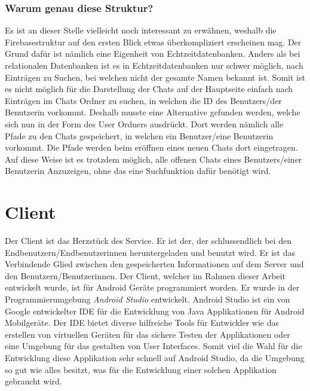 \documentclass[a4paper,11pt]{report}
\begin{document}
				\subsubsection{Warum genau diese Struktur?} \label{warum}
				Es ist an dieser Stelle vielleicht noch interessant zu erwähnen, weshalb die Firebasestruktur auf den ersten Blick etwas überkompliziert erscheinen mag. Der Grund dafür ist nämlich eine Eigenheit von Echtzeitdatenbanken. Anders als bei relationalen Datenbanken ist es in Echtzeitdatenbanken nur schwer möglich, nach Einträgen zu Suchen, bei welchen nicht der gesamte Namen bekannt ist. Somit ist es nicht möglich für die Darstellung der Chats auf der Hauptseite einfach nach Einträgen im Chats Ordner zu suchen, in welchen die ID des Benutzers/der Benutzerin vorkommt. Deshalb musste eine Alternative gefunden werden, welche sich nun in der Form des User Ordners ausdrückt. Dort werden nämlich alle Pfade zu den Chats gespeichert, in welchen ein Benutzer/eine Benutzerin vorkommt. Die Pfade werden beim eröffnen eines neuen Chats dort eingetragen. Auf diese Weise ist es trotzdem möglich, alle offenen Chats eines Benutzers/einer Benutzerin Anzuzeigen, ohne das eine Suchfunktion dafür benötigt wird.
		\section{Client}
		Der Client ist das Herzstück des Service. Er ist der, der schlussendlich bei den Endbenutzern/Endbenutzerinnen heruntergeladen und benutzt wird. Er ist das Verbindende Glied zwischen den gespeicherten Informationen auf dem Server und den Benutzern/Benutzerinnen. Der Client, welcher im Rahmen dieser Arbeit entwickelt wurde, ist für Android Geräte programmiert worden. Er wurde in der Programmierumgebung \emph{Android Studio} entwickelt. Android Studio ist ein von Google entwickelter IDE für die Entwicklung von Java Applikationen für Android Mobilgeräte. Der IDE bietet diverse hilfreiche Tools für Entwickler wie das erstellen von virtuellen  Geräten für das sichere Testen der Applikationen oder eine Umgebung für das gestalten von User Interfaces. Somit viel die Wahl für die Entwicklung diese Applikation sehr schnell auf Android Studio, da die Umgebung so gut wie alles besitzt, was für die Entwicklung einer solchen Applikation gebraucht wird.
\end{document}
